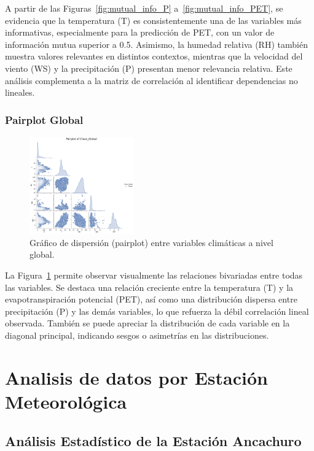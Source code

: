 A partir de las Figuras~\ref{fig:mutual_info_P} a~\ref{fig:mutual_info_PET}, se evidencia que la temperatura (T) es consistentemente una de las variables más informativas, especialmente para la predicción de PET, con un valor de información mutua superior a 0.5. Asimismo, la humedad relativa (RH) también muestra valores relevantes en distintos contextos, mientras que la velocidad del viento (WS) y la precipitación (P) presentan menor relevancia relativa. Este análisis complementa a la matriz de correlación al identificar dependencias no lineales.

\subsection{Pairplot Global}

\begin{figure}[H]
    \centering
    \includegraphics[width=0.4\textwidth]{resultados/global/bivariado/pairplot_global.png}
    \caption{Gráfico de dispersión (pairplot) entre variables climáticas a nivel global.}
    \label{fig:pairplot_global}
\end{figure}

La Figura~\ref{fig:pairplot_global} permite observar visualmente las relaciones bivariadas entre todas las variables. Se destaca una relación creciente entre la temperatura (T) y la evapotranspiración potencial (PET), así como una distribución dispersa entre precipitación (P) y las demás variables, lo que refuerza la débil correlación lineal observada. También se puede apreciar la distribución de cada variable en la diagonal principal, indicando sesgos o asimetrías en las distribuciones.



\chapter{Analisis de datos por Estación Meteorológica}

\section{Análisis Estadístico de la Estación Ancachuro}


